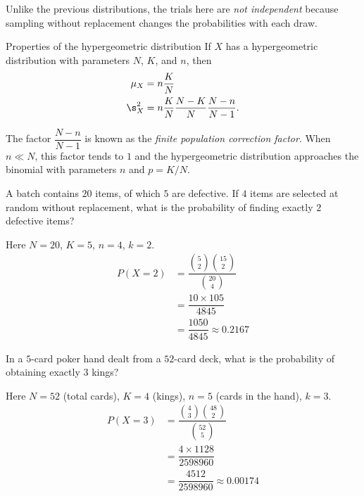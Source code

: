 Unlike the previous distributions, the trials here are \emph{not independent} because sampling without replacement changes the probabilities with each draw.

{Properties of the hypergeometric distribution} If $X$ has a hypergeometric distribution with parameters $N$, $K$, and $n$, then
\begin{align}
 \mu_{X} &= n\dfrac{K}{N} \\
 \s_{X}^{2} &= n\dfrac{K}{N}\dfrac{N-K}{N}\dfrac{N-n}{N-1}.
\end{align}

The factor $\dfrac{N-n}{N-1}$ is known as the \emph{finite population correction factor}. When $n \ll N$, this factor tends to $1$ and the hypergeometric distribution approaches the binomial with parameters $n$ and $p=K/N$.

\begin{ejemplo}
 \label{exmp:2.10.16}
 A batch contains $20$ items, of which $5$ are defective. If $4$ items are selected at random without replacement, what is the probability of finding exactly $2$ defective items?
\end{ejemplo}

\begin{solucion}
	Here $N=20$, $K=5$, $n=4$, $k=2$.
	\begin{align}
		P(X=2) &= \dfrac{\binom{5}{2}\binom{15}{2}}{\binom{20}{4}} \\
		&= \dfrac{10 \times 105}{4845} \\
		&= \dfrac{1050}{4845} \approx 0.2167
	\end{align}
\end{solucion}

\begin{ejemplo}
 \label{exmp:2.10.17}
 In a $5$-card poker hand dealt from a $52$-card deck, what is the probability of obtaining exactly $3$ kings?
\end{ejemplo}

\begin{solucion}
	Here $N=52$ (total cards), $K=4$ (kings), $n=5$ (cards in the hand), $k=3$.
	\begin{align}
		P(X=3) &= \dfrac{\binom{4}{3}\binom{48}{2}}{\binom{52}{5}} \\
		&= \dfrac{4 \times 1128}{2598960} \\
		&= \dfrac{4512}{2598960} \approx 0.00174
	\end{align}
\end{solucion}



